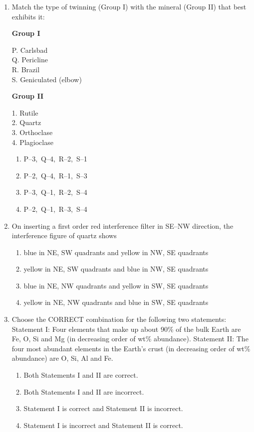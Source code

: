 \documentclass[journal,12pt,onecolumn]{IEEEtran}
\theoremstyle{remark}
\begin{document}
\begin{enumerate}
\item Match the type of twinning (Group I) with the mineral (Group II) that best exhibits it:

\begin{multicols}{2}
\textbf{Group I}
\begin{flushleft}
P. Carlsbad\\
Q. Pericline\\
R. Brazil\\
S. Geniculated (elbow)
\end{flushleft}

\columnbreak

\textbf{Group II}
\begin{flushleft}
1. Rutile\\
2. Quartz\\
3. Orthoclase\\
4. Plagioclase
\end{flushleft}
\end{multicols}

\begin{multicols}{2}
\begin{enumerate}
\item P--3,\ Q--4,\ R--2,\ S--1
\item P--2,\ Q--4,\ R--1,\ S--3
\item P--3,\ Q--1,\ R--2,\ S--4
\item P--2,\ Q--1,\ R--3,\ S--4
\end{enumerate}
\end{multicols}


\item On inserting a first order red interference filter in SE--NW direction, the interference figure of quartz shows  
\begin{enumerate}
\item blue in NE, SW quadrants and yellow in NW, SE quadrants
\item yellow in NE, SW quadrants and blue in NW, SE quadrants
\item blue in NE, NW quadrants and yellow in SW, SE quadrants
\item yellow in NE, NW quadrants and blue in SW, SE quadrants
\end{enumerate}

\item Choose the CORRECT combination for the following two statements:  
Statement I: Four elements that make up about 90\% of the bulk Earth are Fe, O, Si and Mg (in decreasing order of wt\% abundance).  
Statement II: The four most abundant elements in the Earth's crust (in decreasing order of wt\% abundance) are O, Si, Al and Fe.  
\begin{enumerate}
\item Both Statements I and II are correct.
\item Both Statements I and II are incorrect.
\item Statement I is correct and Statement II is incorrect.
\item Statement I is incorrect and Statement II is correct.
\end{enumerate}


\end{enumerate}
\end{document}
